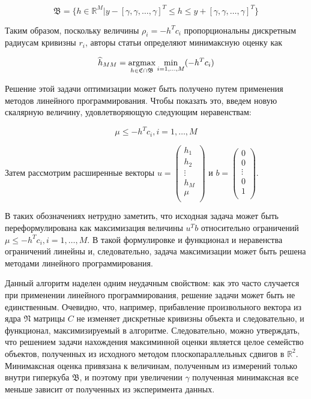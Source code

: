 \documentclass[a4paper, 12pt, titlepage]{article}
\theoremstyle{definition}
\theoremstyle{plain}
\theoremstyle{plain}
\begin{document}
\begin{equation}
\mathfrak{B} = \{h \in \mathbb{R}^{M} |
y - [\gamma, \gamma, \ldots, \gamma]^{T} \leq h \leq
y + [\gamma, \gamma, \ldots, \gamma]^{T}\}
\end{equation}

Таким образом, поскольку величины $\rho_{i} = - h^{T} c_{i}$ пропорциональны
дискретным радиусам кривизны $r_{i}$, авторы статьи определяют минимаксную
оценку как

\begin{equation}
\widehat{h}_{MM} =
\operatornamewithlimits{argmax}_{h \in \mathfrak{C} \cap \mathfrak{B}}
\min_{i = 1, \ldots, M} ( - h^{T} c_{i})
\end{equation}

Решение этой задачи оптимизации может быть получено путем применения методов
линейного программирования. Чтобы показать это, введем новую скалярную величину,
удовлетворяющую следующим неравенствам:

\begin{equation}
\mu \leq - h^{T} c_{i}, i = 1, \ldots, M
\end{equation}

Затем рассмотрим расширенные векторы
$u = \left(
\begin{array}{c}
 h_{1} \\
 h_{2} \\
 \vdots \\
 h_{M} \\
 \mu \\
\end{array}
\right)$ и
$ b = \left(\begin{array}{c}
 0 \\
 0 \\
 \vdots \\
 0 \\
 1 \\
\end{array}
\right)$.

В таких обозначениях нетрудно заметить, что исходная задача может
быть переформулирована как максимизация величины $u^{T} b$ относительно
ограничений $\mu \leq - h^{T} c_{i}, i = 1, \ldots, M$. В такой формулировке и
функционал и неравенства ограничений линейны и, следовательно, задача
максимизации может быть решена методами линейного программирования.

Данный алгоритм наделен одним неудачным свойством: как это часто случается при
применении линейного программирования, решение задачи может быть не
единственным. Очевидно, что, например, прибавление произвольного вектора из ядра
$\mathfrak{N}$ матрицы $C$ не изменяет дискретные кривизны объекта и
следовательно, и функционал, максимизируемый в алгоритме. Следовательно, можно
утверждать, что решением задачи нахождения максиминной оценки является целое
семейство объектов, полученных из исходного методом плоскопараллельных сдвигов в
$\mathbb{R}^{2}$. Минимаксная оценка привязана к величинам, полученным из
измерений только внутри гиперкуба $\mathfrak{B}$, и поэтому при увеличении
$\gamma$ полученная минимаксная все меньше зависит от полученных из эксперимента
данных.
\end{document}
